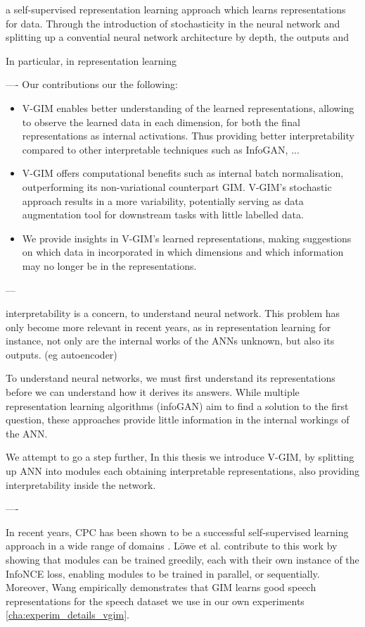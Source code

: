a self-supervised representation learning approach which learns representations for data. Through the introduction of stochasticity in the neural network and splitting up a convential neural network architecture by depth, the outputs and 

In particular, in representation learning 

----
Our contributions our the following:
\begin{itemize}
	\item V-GIM enables better understanding of the learned representations, allowing to observe the learned data in each dimension, for both the final representations as internal activations. Thus providing better interpretability compared to other interpretable techniques such as InfoGAN, ...
	\item V-GIM offers computational benefits such as internal batch normalisation, outperforming its non-variational counterpart GIM. V-GIM's stochastic approach results in a more variability, potentially serving as data augmentation tool for downstream tasks with little labelled data.
	\item We provide insights in V-GIM's learned representations, making suggestions on which data in incorporated in which dimensions and which information may no longer be in the representations.
\end{itemize}
---

interpretability is a concern, to understand neural network. This problem has only become more relevant in recent years, as in representation learning for instance, not only are the internal works of the ANNs unknown, but also its outputs. (eg autoencoder)

To understand neural networks, we must first understand its representations before we can understand how it derives its answers. While multiple representation learning algorithms (infoGAN) aim to find a solution to the first question, these approaches provide little information in the internal workings of the ANN.

We attempt to go a step further,
In this thesis we introduce V-GIM, by splitting up ANN into modules each obtaining interpretable representations, also providing interpretability inside the network.

----


In recent years, CPC has been shown to be a successful self-supervised learning approach in a wide range of domains \citep{stackeEvaluationContrastivePredictive2020, dehaanContrastivePredictiveCoding2021, luSemiSupervisedHistologyClassification2019, bhatiSegmentalContrastivePredictive2021b, deldariTimeSeriesChange2021, henaffDataEfficientImageRecognition2020}. Löwe et al. contribute to this work by showing that modules can be trained greedily, each with their own instance of the InfoNCE loss, enabling modules to be trained in parallel, or sequentially. Moreover, Wang \citep{meihanwangSpeechRepresentationLearning2019} empirically demonstrates that GIM learns good speech representations for the speech dataset we use in our own experiments \ref{cha:experim_details_vgim}.


